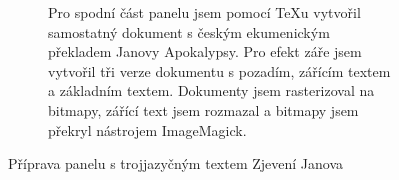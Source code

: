 \begin{figure}[p]
\begin{subfigure}{\linewidth}
\centering
{}
\par\vspace{-1.5pt}
\caption{Pro spodní část panelu jsem pomocí \TeX u vytvořil samostatný dokument s českým ekumenickým překladem Janovy Apokalypsy. Pro efekt záře jsem vytvořil tři verze dokumentu s pozadím, zářícím textem a základním textem. Dokumenty jsem rasterizoval na bitmapy, zářící text jsem rozmazal a bitmapy jsem překryl nástrojem ImageMagick.}
\label{fig:screen2-texts-czech}
\end{subfigure}
\caption{Příprava panelu s trojjazyčným textem Zjevení Janova}
\label{fig:screen2-texts}
\end{figure}